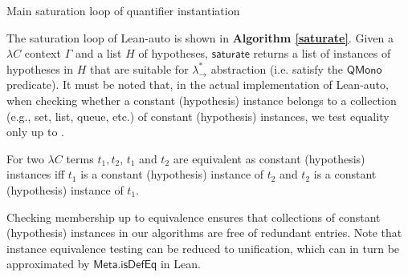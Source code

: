 \begin{algorithm}\label{saturate}
  \DontPrintSemicolon
  \SetNoFillComment
  \caption{Main saturation loop of quantifier instantiation}
\end{algorithm}

The saturation loop of Lean-auto is shown in \textbf{Algorithm \ref{saturate}}.
Given a $\lambda C$ context $\Gamma$ and a list $H$ of hypotheses, $\mathsf{saturate}$ returns
a list of instances of hypotheses in $H$ that are suitable for $\lambda_\to^*$ abstraction
(i.e. satisfy the $\mathsf{QMono}$ predicate).
It must be noted that, in the actual implementation of Lean-auto, when
checking whether a constant (hypothesis) instance belongs to a collection (e.g., set, list, queue, etc.)
of constant (hypothesis) instances, we test equality only up to .

\begin{definition}
For two $\lambda C$ terms $t_1, t_2$, $t_1$ and $t_2$ are equivalent as constant (hypothesis) instances
iff $t_1$ is a constant (hypothesis) instance of $t_2$ and $t_2$ is a constant (hypothesis)
instance of $t_1$.
\end{definition}

Checking membership up to equivalence ensures that collections of constant (hypothesis)
instances in our algorithms are free of redundant entries. Note that instance equivalence testing
can be reduced to unification, which can in turn be approximated by $\mathsf{Meta.isDefEq}$ in Lean.
 